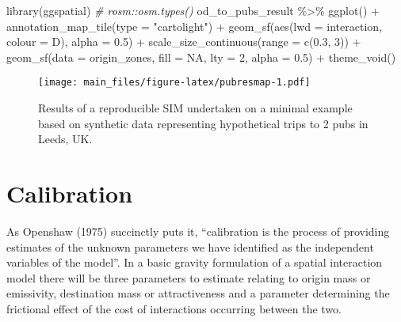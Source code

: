 \documentclass[11pt,letterpaper]{article}
\newenvironment{Shaded}{\begin{snugshade}}{\end{snugshade}}
\newcommand{\AttributeTok}[1]{\textcolor[rgb]{0.77,0.63,0.00}{#1}}
\newcommand{\CommentTok}[1]{\textcolor[rgb]{0.56,0.35,0.01}{\textit{#1}}}
\newcommand{\ConstantTok}[1]{\textcolor[rgb]{0.00,0.00,0.00}{#1}}
\newcommand{\DecValTok}[1]{\textcolor[rgb]{0.00,0.00,0.81}{#1}}
\newcommand{\FloatTok}[1]{\textcolor[rgb]{0.00,0.00,0.81}{#1}}
\newcommand{\FunctionTok}[1]{\textcolor[rgb]{0.00,0.00,0.00}{#1}}
\newcommand{\NormalTok}[1]{#1}
\newcommand{\SpecialCharTok}[1]{\textcolor[rgb]{0.00,0.00,0.00}{#1}}
\newcommand{\StringTok}[1]{\textcolor[rgb]{0.31,0.60,0.02}{#1}}
\begin{document}
\begin{Shaded}
\begin{Highlighting}[]
\FunctionTok{library}\NormalTok{(ggspatial)}
\CommentTok{\# rosm::osm.types()}
\NormalTok{od\_to\_pubs\_result }\SpecialCharTok{\%\textgreater{}\%} 
  \FunctionTok{ggplot}\NormalTok{() }\SpecialCharTok{+}
  \FunctionTok{annotation\_map\_tile}\NormalTok{(}\AttributeTok{type =} \StringTok{"cartolight"}\NormalTok{) }\SpecialCharTok{+}
  \FunctionTok{geom\_sf}\NormalTok{(}\FunctionTok{aes}\NormalTok{(}\AttributeTok{lwd =}\NormalTok{ interaction, }\AttributeTok{colour =}\NormalTok{ D), }\AttributeTok{alpha =} \FloatTok{0.5}\NormalTok{) }\SpecialCharTok{+}
  \FunctionTok{scale\_size\_continuous}\NormalTok{(}\AttributeTok{range =} \FunctionTok{c}\NormalTok{(}\FloatTok{0.3}\NormalTok{, }\DecValTok{3}\NormalTok{)) }\SpecialCharTok{+}
  \FunctionTok{geom\_sf}\NormalTok{(}\AttributeTok{data =}\NormalTok{ origin\_zones, }\AttributeTok{fill =} \ConstantTok{NA}\NormalTok{, }\AttributeTok{lty =} \DecValTok{2}\NormalTok{, }\AttributeTok{alpha =} \FloatTok{0.5}\NormalTok{) }\SpecialCharTok{+}
  \FunctionTok{theme\_void}\NormalTok{()}
\end{Highlighting}
\end{Shaded}

\begin{figure}
\centering
\texttt{[image: main\_files/figure-latex/pubresmap-1.pdf]}
\caption{\label{fig:pubresmap}Results of a reproducible SIM undertaken on a minimal example based on synthetic data representing hypothetical trips to 2 pubs in Leeds, UK.}
\end{figure}

\hypertarget{calibration}{%
\section{Calibration}\label{calibration}}

As Openshaw (1975) succinctly puts it, ``calibration is the process of providing estimates of the unknown parameters we have identified as the independent variables of the model''.
In a basic gravity formulation of a spatial interaction model there will be three parameters to estimate relating to origin mass or emissivity, destination mass or attractiveness and a parameter determining the frictional effect of the cost of interactions occurring between the two.
\end{document}
